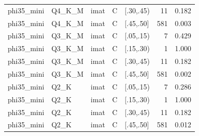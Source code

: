 \begin{tabular}{lllllrr}
phi35\_mini & Q4\_K\_M & imat & C & [.30,.45) & 11 & 0.182 \\
phi35\_mini & Q4\_K\_M & imat & C & [.45,.50] & 581 & 0.003 \\
phi35\_mini & Q3\_K\_M & imat & C & [.05,.15) & 7 & 0.429 \\
phi35\_mini & Q3\_K\_M & imat & C & [.15,.30) & 1 & 1.000 \\
phi35\_mini & Q3\_K\_M & imat & C & [.30,.45) & 11 & 0.182 \\
phi35\_mini & Q3\_K\_M & imat & C & [.45,.50] & 581 & 0.002 \\
phi35\_mini & Q2\_K & imat & C & [.05,.15) & 7 & 0.286 \\
phi35\_mini & Q2\_K & imat & C & [.15,.30) & 1 & 1.000 \\
phi35\_mini & Q2\_K & imat & C & [.30,.45) & 11 & 0.182 \\
phi35\_mini & Q2\_K & imat & C & [.45,.50] & 581 & 0.012 \\
\bottomrule
\end{tabular}
